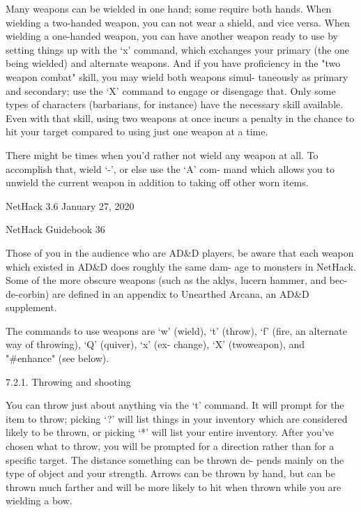 \documentclass[11pt]{article}
\begin{document}
   Many weapons can be wielded in one hand; some require both
hands. When wielding a two-handed weapon, you can not wear a
shield, and vice versa. When wielding a one-handed weapon, you
can have another weapon ready to use by setting things up with
the `x' command, which exchanges your primary (the one being
wielded) and alternate weapons. And if you have proficiency in
the "two weapon combat" skill, you may wield both weapons simul-
taneously as primary and secondary; use the `X' command to engage
or disengage that.  Only some types of characters (barbarians,
for instance) have the necessary skill available. Even with that
skill, using two weapons at once incurs a penalty in the chance
to hit your target compared to using just one weapon at a time.

   There might be times when you'd rather not wield any weapon
at all. To accomplish that, wield `-', or else use the `A' com-
mand which allows you to unwield the current weapon in addition
to taking off other worn items.


NetHack 3.6                   January 27, 2020





NetHack Guidebook                       36



   Those of you in the audience who are AD\&D players, be aware
that each weapon which existed in AD\&D does roughly the same dam-
age to monsters in NetHack. Some of the more obscure weapons
(such as the aklys, lucern hammer, and bec-de-corbin) are defined
in an appendix to Unearthed Arcana, an AD\&D supplement.

   The commands to use weapons are `w' (wield), `t' (throw),
`f' (fire, an alternate way of throwing), `Q' (quiver), `x' (ex-
change), `X' (twoweapon), and "\#enhance" (see below).

7.2.1. Throwing and shooting

   You can throw just about anything via the `t' command. It
will prompt for the item to throw; picking `?' will list things
in your inventory which are considered likely to be thrown, or
picking `*' will list your entire inventory. After you've chosen
what to throw, you will be prompted for a direction rather than
for a specific target. The distance something can be thrown de-
pends mainly on the type of object and your strength. Arrows can
be thrown by hand, but can be thrown much farther and will be
more likely to hit when thrown while you are wielding a bow.
\end{document}
